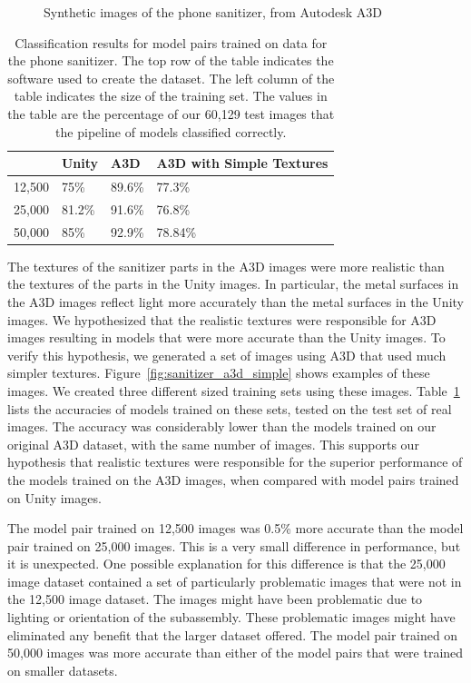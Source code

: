 \begin{figure}
  \caption{
    Synthetic images of the phone sanitizer, from Autodesk A3D
  }\label{fig:sanitizer_a3d}
\end{figure}

\begin{table}[h]
\begin{tabular}{|l||l|l|l|}
  \hline
  & Unity & A3D & A3D with Simple Textures\\
  \hline
  \hline
  12,500 & 75\% & 89.6\% & 77.3\%\\
  \hline
  25,000 & 81.2\% & 91.6\% & 76.8\%\\
  \hline
  50,000 & 85\% & 92.9\% & 78.84\%\\
  \hline
\end{tabular}
  \caption[
  Classification results for model pairs trained on data for the phone sanitizer
  ]{
    Classification results for model pairs trained on data for the phone
    sanitizer.
    The top row of the table indicates the software used to create the dataset.
    The left column of the table indicates the size of the training set.
    The values in the table are the percentage of our 60,129 test images that
    the pipeline of models classified correctly.
  }\label{tab:sanitizer_accuracy}
\end{table}

The textures of the sanitizer parts in the A3D images were more realistic than
the textures of the parts in the Unity images.
In particular, the metal surfaces in the A3D images reflect light more
accurately than the metal surfaces in the Unity images.
We hypothesized that the realistic textures were responsible for A3D images
resulting in models that were more accurate than the Unity images.
To verify this hypothesis, we generated a set of images using A3D that used much
simpler textures.
Figure~\ref{fig:sanitizer_a3d_simple} shows examples of these images.
We created three different sized training sets using these images.
Table~\ref{tab:sanitizer_accuracy} lists the accuracies of
models trained on these sets, tested on the test set of real images.
The accuracy was considerably lower than the models trained on our original A3D
dataset, with the same number of images.
This supports our hypothesis that realistic textures were responsible for
the superior performance of the models trained on the A3D images, when
compared with model pairs trained on Unity images.

The model pair trained on 12,500 images was 0.5\% more accurate than the model
pair trained on 25,000 images.
This is a very small difference in performance, but it is unexpected.
One possible explanation for this difference is that the 25,000 image dataset
contained a set of particularly problematic images that were not in the 12,500
image dataset.
The images might have been problematic due to lighting or orientation of the
subassembly.
These problematic images might have eliminated any benefit that the larger
dataset offered.
The model pair trained on 50,000 images was more accurate than either of the
model pairs that were trained on smaller datasets.

